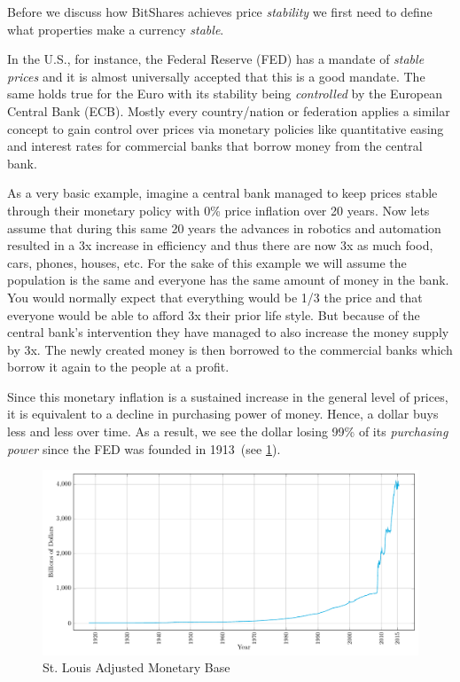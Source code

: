 Before we discuss how BitShares achieves price \emph{stability} we first need to
define what properties make a currency \emph{stable}.

In the U.S., for instance, the Federal Reserve (FED) has a mandate of
\emph{stable prices} and it is almost universally accepted that this is a good
mandate. The same holds true for the Euro with its stability being
\emph{controlled} by the European Central Bank (ECB). Mostly every
country/nation or federation applies a similar concept to gain control over
prices via monetary policies like quantitative easing and interest rates for
commercial banks that borrow money from the central bank.

As a very basic example, imagine a central bank managed to keep prices stable
through their monetary policy with 0\% price inflation over 20 years. Now lets
assume that during this same 20 years the advances in robotics and automation
resulted in a 3x increase in efficiency and thus there are now 3x as much food,
cars, phones, houses, etc. For the sake of this example we will assume the
population is the same and everyone has the same amount of money in the bank.
You would normally expect that everything would be 1/3 the price and that
everyone would be able to afford 3x their prior life style. But because of the
central bank's intervention they have managed to also increase the money supply
by 3x. The newly created money is then borrowed to the commercial banks which
borrow it again to the people at a profit.

Since this monetary inflation is a sustained increase in the general level of
prices, it is equivalent to a decline in purchasing power of money.  Hence, a
dollar buys less and less over time. As a result, we see the dollar losing 99\%
of its \emph{purchasing power} since the FED was founded in 1913~(see
\cref{fig:monetarybase}). 

\begin{figure}[!htp]
 \centering
 \includegraphics[width=\linewidth]{figures/monetary-base}
 \caption{St. Louis Adjusted Monetary Base~\cite{ambsl}}
 \label{fig:monetarybase}
\end{figure}

